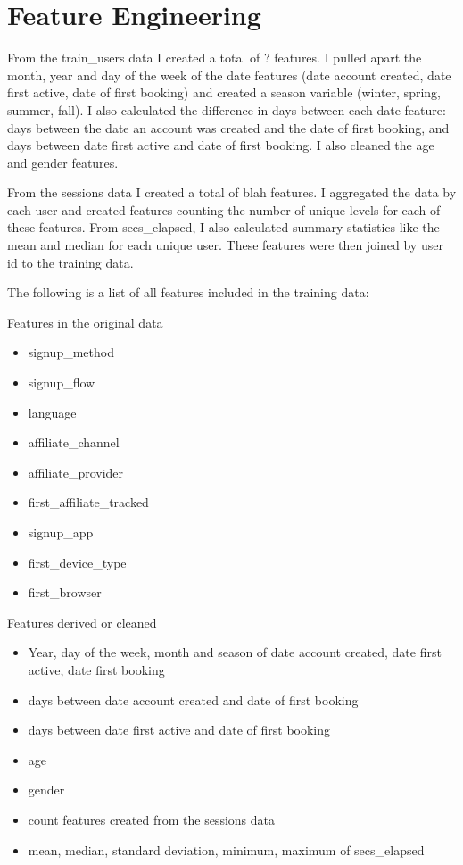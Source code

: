 \documentclass{article}
\begin{document}
\section{Feature Engineering}

From the train\_users data I created a total of ? features. I pulled apart the month, year and day of 
the week of the date features (date account created, date first active, date of first booking) and created 
a season variable (winter, spring, summer, fall). I also calculated the difference in days between each 
date feature:  days between the date an account was created and the date of first booking, and days 
between date first active and date of first booking. I also cleaned the age and gender features. 

From the sessions data I created a total of blah features. I aggregated the data by each user and 
created features counting the number of unique levels for each of these features. From secs\_elapsed, 
I also calculated summary statistics like the mean and median for each unique user. These features 
were then joined by user id to the training data. 

The following is a list of all features included in the training data: 

Features in the original data
\begin{itemize}
  \item signup\_method
  \item signup\_flow
  \item language
  \item affiliate\_channel 
  \item affiliate\_provider
  \item first\_affiliate\_tracked
  \item signup\_app
  \item first\_device\_type
  \item first\_browser
\end{itemize}

Features derived or cleaned 
\begin{itemize}
  \item Year, day of the week, month and season of date account created, date first active, date first booking 
  \item days between date account created and date of first booking
  \item days between date first active and date of first booking 
  \item age
  \item gender
  \item count features created from the sessions data 
  \item mean, median, standard deviation, minimum, maximum of secs\_elapsed
\end{itemize}
\end{document}
